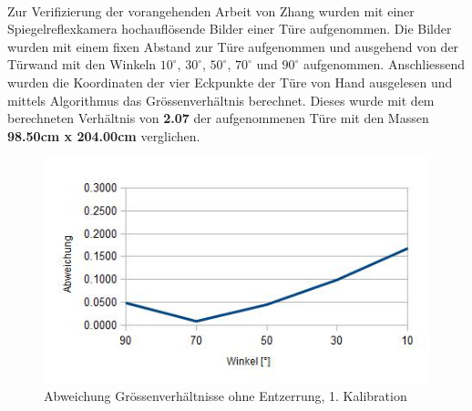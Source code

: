 \paragraph{}
Zur Verifizierung der vorangehenden Arbeit von Zhang \cite{zhangrectification} wurden mit einer Spiegelreflexkamera hochauflösende Bilder einer Türe aufgenommen. Die Bilder wurden mit einem fixen Abstand zur Türe aufgenommen und ausgehend von der Türwand mit den Winkeln $10^\circ$, $30^\circ$, $50^\circ$, $70^\circ$ und $90^\circ$ aufgenommen. Anschliessend wurden die Koordinaten der vier Eckpunkte der Türe von Hand ausgelesen und mittels Algorithmus das Grössenverhältnis berechnet. Dieses wurde mit dem berechneten Verhältnis von \textbf{2.07} der aufgenommenen Türe mit den Massen \textbf{98.50cm x 204.00cm} verglichen.

\begin{center}
\end{center}


\begin{figure}[!ht]
  \centering
  \includegraphics[width=0.75\linewidth]{images/ratio_v1_dist.jpg}
  \caption{Abweichung Grössenverhältnisse ohne Entzerrung, 1. Kalibration}
  \label{fig:ratio-v1-dist}
\end{figure}

